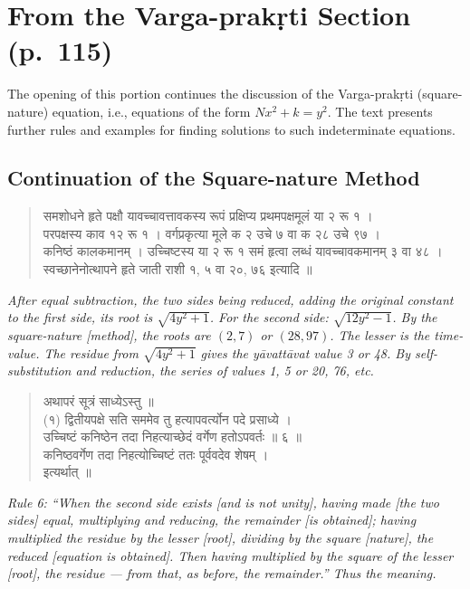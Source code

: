 \documentclass[11pt,a4paper]{article}
\newcommand{\cnote}[1]{\textcolor{notecolor}{\textit{#1}}}
\newcommand{\dev}[1]{{\devanagarifont #1}}
\newenvironment{sanskritverse}{%
  \begin{quote}
}{%
  \end{quote}
}
\begin{document}
\section{From the Varga-prakṛti Section (p.\ 115)}

The opening of this portion continues the discussion of the Varga-prakṛti (square-nature) equation, i.e., equations of the form $Nx^2 + k = y^2$. The text presents further rules and examples for finding solutions to such indeterminate equations.

\subsection*{Continuation of the Square-nature Method}

\begin{sanskritverse}
\dev{%
समशोधने हृते पक्षौ यावच्चावत्तावकस्य रूपं प्रक्षिप्य प्रथमपक्षमूलं या २ रू १ ।\\
परपक्षस्य काव १२ रू १ । वर्गप्रकृत्या मूले क २ उचे ७ वा क २८ उचे ९७ ।\\
कनिष्ठं कालकमानम् । उच्चिष्टस्य या २ रू १ समं हृत्वा लब्धं यावच्चावकमानम् ३ वा ४८ ।\\
स्वच्छानेनोत्थापने हृते जाती राशी १, ५ वा २०, ७६ इत्यादि ॥}
\end{sanskritverse}

\cnote{After equal subtraction, the two sides being reduced, adding the original constant to the first side, its root is $\sqrt{4y^2 + 1}$. For the second side: $\sqrt{12y^2 - 1}$. By the square-nature [method], the roots are $(2, 7)$ or $(28, 97)$. The lesser is the time-value. The residue from $\sqrt{4y^2 + 1}$ gives the yāvattāvat value 3 or 48. By self-substitution and reduction, the series of values 1, 5 or 20, 76, etc.}

\bigskip

\begin{sanskritverse}
\dev{%
अथापरं सूत्रं साध्येऽस्तु ॥\\[0.5em]
(१) द्वितीयपक्षे सति सममेव तु हत्यापवर्त्योन पदे प्रसाध्ये ।\\
उच्चिष्टं कनिष्ठेन तदा निहत्याच्छेदं वर्गेण हतोऽपवर्तः ॥ ६ ॥\\
कनिष्ठवर्गेण तदा निहत्योच्चिष्टं ततः पूर्ववदेव शेषम् ।\\
इत्यर्थात् ॥}
\end{sanskritverse}

\cnote{Rule 6: ``When the second side exists [and is not unity], having made [the two sides] equal, multiplying and reducing, the remainder [is obtained]; having multiplied the residue by the lesser [root], dividing by the square [nature], the reduced [equation is obtained]. Then having multiplied by the square of the lesser [root], the residue --- from that, as before, the remainder.'' Thus the meaning.}
\end{document}
